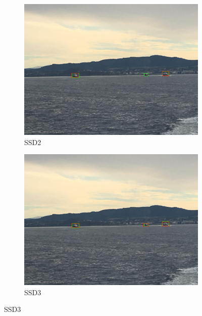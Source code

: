 \begin{figure}[h!]
\begin{subfigure}{.5\textwidth}
  \centering
  \includegraphics[width=0.8\linewidth]{results/case_buildings/ssdtrf/ssd2/3better/IMG_2216.jpg}
  \caption{SSD2}
\end{subfigure}%
\begin{subfigure}{.5\textwidth}
  \centering
  \includegraphics[width=.8\linewidth]{results/case_buildings/ssdtrf/ssd3/3better/IMG_2216.jpg}
  \caption{SSD3}
\end{subfigure}


\end{figure}
